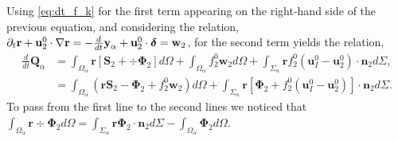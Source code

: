 Using \ref{eq:dt_f_k} for the first term appearing on the right-hand side of the previous equation, and considering the relation,
$  \partial_t \textbf{r}
+ \textbf{u}_2^0 \cdot \mathbf{\nabla} \textbf{r}
= - \frac{d}{dt} \textbf{y}_\alpha  + \textbf{u}_2^0 \cdot \bm\delta
= \textbf{w}_2$,
for the second term yields the relation,
\begin{align*}
    \frac{d}{dt} \textbf{Q}_\alpha
    &= \int_{\Omega_\alpha} \textbf{r} \left[
         \textbf{S}_2 +  \div \mathbf{\Phi}_2
    \right]d\Omega
    +\int_{\Omega_\alpha} f_2^0  \textbf{w}_2 d\Omega
    + \int_{\Sigma_\alpha} \textbf{r}  f_2^0 (\textbf{u}_I^0-\textbf{u}_2^0)\cdot \textbf{n}_2  d\Sigma,\\
    &= \int_{\Omega_\alpha} \left( 
        \textbf{r} \textbf{S}_2 
        - \mathbf{\Phi}_2
        + f_2^0  \textbf{w}_2 
    \right) d\Omega
    + \int_{\Sigma_\alpha} \textbf{r} \left[
        \mathbf{\Phi}_2
        + f_2^0 (\textbf{u}_I^0-\textbf{u}_2^0)
    \right]\cdot \textbf{n}_2  d\Sigma.
\end{align*}
To pass from the first line to the second lines we noticed that $\int_{\Omega_\alpha} \textbf{r}  \div \mathbf{\Phi}_2 d\Omega
= \int_{\Sigma_\alpha} \textbf{r} \mathbf{\Phi}_2 \cdot \textbf{n}_2 d\Sigma
- \int_{\Omega_\alpha} \mathbf{\Phi}_2 d\Omega$. 





